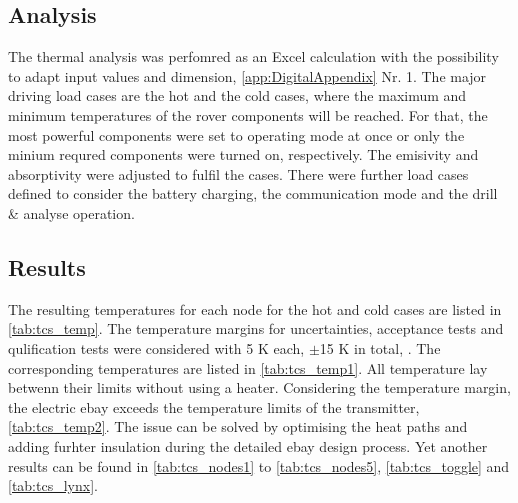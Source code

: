 \subsection{Analysis}
The thermal analysis was perfomred as an Excel calculation with the  possibility to adapt input values and dimension, \autoref{app:DigitalAppendix} Nr. 1.
The major driving load cases are the  hot and the cold cases, where the maximum and minimum temperatures of the rover components will be reached.
For that, the most powerful components were set to operating mode at once or only the minium requred components were turned on, respectively.
The emisivity and absorptivity were adjusted to fulfil the cases.
There were further load cases defined to consider the  battery charging, the communication mode and the drill \& analyse operation.

\subsection{Results}
The resulting temperatures for each node for the hot and cold cases  are listed in \autoref{tab:tcs_temp}.
The temperature margins for uncertainties, acceptance tests and qulification tests were considered with 5 K each, $\pm$15 K in total, \cite{ref_tcs_05}.
The corresponding temperatures are listed in \autoref{tab:tcs_temp1}.
All temperature lay betwenn their limits without using a heater.
Considering the temperature margin, the electric ebay exceeds the temperature limits of the transmitter, \autoref{tab:tcs_temp2}.
The issue can be solved by optimising the heat paths and adding furhter insulation during the detailed ebay design process.
Yet another results can be found in \autoref{tab:tcs_nodes1} to \autoref{tab:tcs_nodes5}, \autoref{tab:tcs_toggle} and  \autoref{tab:tcs_lynx}.

